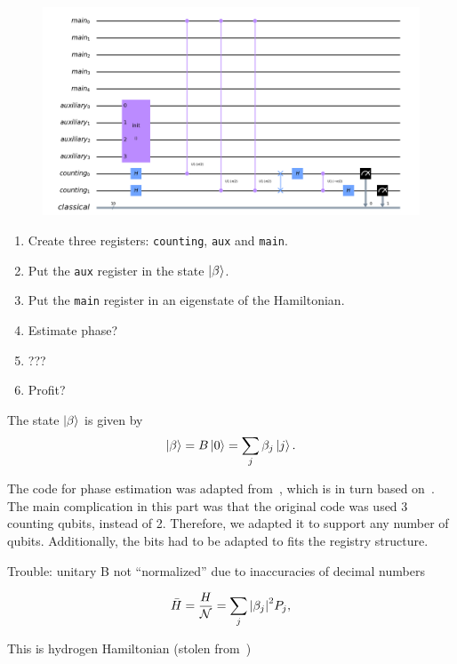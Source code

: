 \documentclass{article}
\begin{document}
\begin{figure}
  \includegraphics[width=linewidth]{unknown-4.png}
\end{figure}


\begin{enumerate}
	\item Create three registers: \verb|counting|, \verb|aux| and \verb|main|.
	\item Put the \verb|aux| register in the state $\ket{\beta}$.
	\item Put the \verb|main| register in an eigenstate of the Hamiltonian.
	\item Estimate phase?
	\item ???
	\item Profit?
\end{enumerate}

The state $\ket\beta$ is given by
\[ \ket\beta = B\ket 0 = \sum_j \beta_j \ket j. \]

The code for phase estimation was adapted from~\cite{Qiskit-Textbook}, which is in turn based on~\textcite{nielsen}. The main complication in this part was that the original code was used 3 counting qubits, instead of 2. Therefore, we adapted it to support any number of qubits. Additionally, the bits had to be adapted to fits the registry structure.

Trouble: unitary B not ``normalized'' due to inaccuracies of decimal numbers

\begin{equation}
	\bar H = \frac H{\mathcal{N}} = \sum_j\abs{\beta_j}^2 P_j,
\end{equation}

This is hydrogen Hamiltonian (stolen from~\cite{seeley})







\printbibliography
\end{document}
